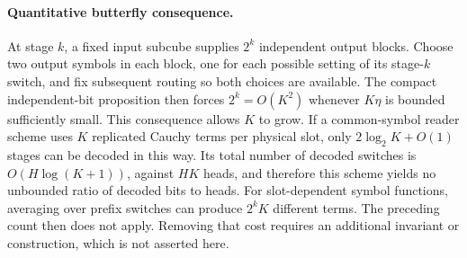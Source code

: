 \documentclass[11pt]{article}
\begin{document}
\paragraph{Quantitative butterfly consequence.}
At stage $k$, a fixed input subcube supplies $2^k$ independent output
blocks. Choose two output symbols in each block, one for each possible
setting of its stage-$k$ switch, and fix subsequent routing so both
choices are available. The compact independent-bit proposition then
forces $2^k=O(K^2)$ whenever $K\eta$ is bounded sufficiently small.
This consequence allows $K$ to grow. If a common-symbol reader scheme
uses $K$ replicated Cauchy terms per physical slot, only
$2\log_2K+O(1)$ stages can be decoded in this way. Its total number of
decoded switches is $O(H\log(K+1))$, against $HK$ heads, and therefore
this scheme yields no unbounded ratio of decoded bits to heads.
For slot-dependent symbol functions, averaging over prefix switches
can produce $2^kK$ different terms. The preceding count then does not
apply. Removing that cost requires an additional invariant or
construction, which is not asserted here.
\end{document}
